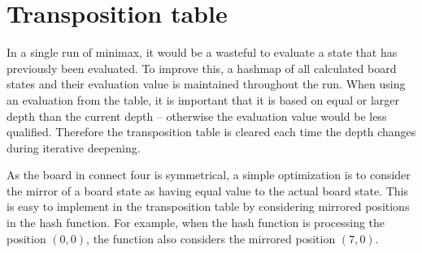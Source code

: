 \section{Transposition table}
In a single run of minimax, it would be a wasteful to evaluate a state that has previously been evaluated.
To improve this, a hashmap of all calculated board states and their evaluation value is maintained throughout the run.
When using an evaluation from the table, it is important that it is based on equal or larger depth than the current depth -- otherwise the evaluation value would be less qualified.
Therefore the transposition table is cleared each time the depth changes during iterative deepening.

As the board in connect four is symmetrical, a simple optimization is to consider the mirror of a board state as having equal value to the actual board state.
This is easy to implement in the transposition table by considering mirrored positions in the hash function.
For example, when the hash function is processing the position $(0, 0)$, the function also considers the mirrored position $(7,0)$.
